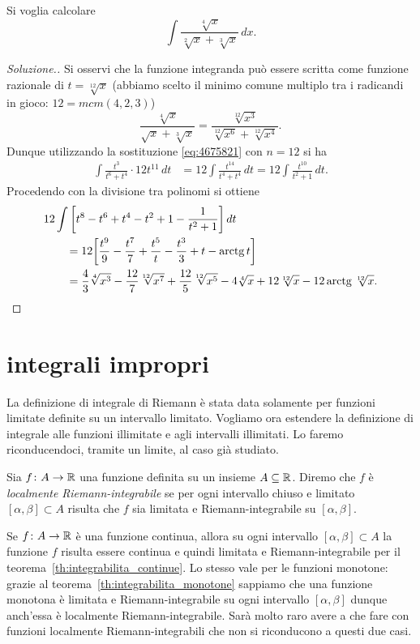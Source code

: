 \begin{example}
Si voglia calcolare
\[
  \int \frac{\sqrt[4]{x}}{\sqrt[2]{x} + \sqrt[3]{x}}\, dx.
\]
\end{example}
\begin{proof}[Soluzione.]
Si osservi che la funzione integranda può essere scritta
come funzione razionale di $t=\sqrt[12]{x}$ (abbiamo scelto
il minimo comune multiplo tra i radicandi in gioco: $12 = mcm(4,2,3)$)
\[
  \frac{\sqrt[4]{x}}{\sqrt{x} + \sqrt[3]{x}}
  = \frac{\sqrt[12]{x^3}}{\sqrt[12]{x^6} + \sqrt[12]{x^4}}.
\]
Dunque utilizzando la sostituzione \eqref{eq:4675821} con $n=12$ si ha
\begin{align*}
\int \frac{t^3}{t^6 + t^4}\cdot 12 t^{11}\, dt
&= 12 \int \frac{t^{14}}{t^4+t^4}\, dt
 = 12 \int \frac{t^{10}}{t^2+1}\, dt.
\end{align*}
Procedendo con la divisione tra polinomi si ottiene
\begin{align*}
\MoveEqLeft{12 \int \Enclose{t^8 - t^6 + t^4 - t^2 + 1 - \frac{1}{t^2+1}}\, dt} \\
&= 12 \Enclose{\frac{t^9}{9} - \frac{t^7}{7} + \frac{t^5}{t} - \frac{t^3}{3} + t - \arctg t} \\
&= \frac 4 3 \sqrt[4]{x^3} - \frac{12}{7}\sqrt[12]{x^7}
+ \frac{12}{5}\sqrt[12]{x^5} - 4 \sqrt[4]{x} + 12 \sqrt[12]{x} - 12 \arctg \sqrt[12]{x}.
\end{align*}
\end{proof}

\section{integrali impropri}

La definizione di integrale di Riemann è stata data solamente per funzioni
limitate definite su un intervallo
limitato.
Vogliamo ora estendere la definizione di integrale alle funzioni illimitate e
agli intervalli illimitati.
Lo faremo riconducendoci, tramite un limite, al caso già studiato.

\begin{definition}
\label{def:localmente_riemann}
Sia $f\colon A \to \mathbb R$ una funzione definita su un insieme $A\subseteq \mathbb R$.
Diremo che $f$ è \emph{localmente Riemann-integrabile} se
per ogni intervallo chiuso e limitato $[\alpha,\beta]\subset A$ risulta
che $f$ sia limitata e Riemann-integrabile su $[\alpha,\beta]$.
\end{definition}

\begin{remark}
Se $f\colon A \to \mathbb R$ è una funzione continua, allora su ogni
intervallo $[\alpha,\beta]\subset A$ la funzione $f$ risulta essere continua
e quindi limitata e Riemann-integrabile per il teorema~\ref{th:integrabilita_continue}.
Lo stesso vale per le funzioni monotone:
grazie al teorema~\ref{th:integrabilita_monotone}
sappiamo che una funzione monotona è limitata e
Riemann-integrabile su ogni intervallo $[\alpha,\beta]$ dunque anch'essa
è localmente Riemann-integrabile. Sarà molto raro avere a che fare con
funzioni localmente Riemann-integrabili che non si riconducono
a questi due casi.
\end{remark}

